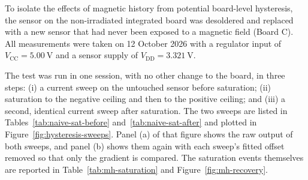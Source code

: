 \documentclass[12pt,a4paper]{article}
\begin{document}
To isolate the effects of magnetic history from potential board-level hysteresis, the sensor on the non-irradiated integrated board was desoldered and replaced with a new sensor that had never been exposed to a magnetic field (Board C). All measurements were taken on 12 October 2026 with a regulator input of $V_{\text{CC}} = \SI{5.00}{\volt}$ and a sensor supply of $V_{\text{DD}} = \SI{3.321}{\volt}$.

The test was run in one session, with no other change to the board, in three steps: (i) a current sweep on the untouched sensor before saturation; (ii) saturation to the negative ceiling and then to the positive ceiling; and (iii) a second, identical current sweep after saturation. The two sweeps are listed in Tables~\ref{tab:naive-sat-before} and~\ref{tab:naive-sat-after} and plotted in Figure~\ref{fig:hysteresis-sweeps}. Panel (a) of that figure shows the raw output of both sweeps, and panel (b) shows them again with each sweep's fitted offset removed so that only the gradient is compared. The saturation events themselves are reported in Table~\ref{tab:mh-saturation} and Figure~\ref{fig:mh-recovery}.
\end{document}
